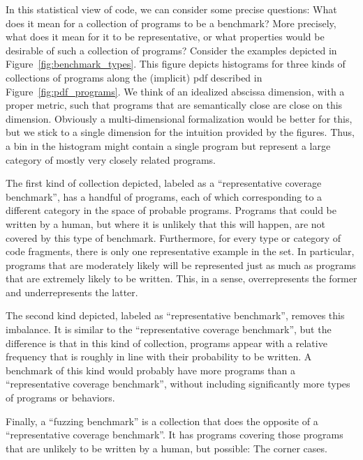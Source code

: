 In this statistical view of code, we can consider some precise questions: What does it mean for a collection of programs to be a benchmark?
More precisely, what does it mean for it to be representative, or what properties would be desirable of such a collection of programs?
Consider the examples depicted in Figure~\ref{fig:benchmark_types}.
This figure depicts histograms for three kinds of collections of programs along the (implicit) pdf described in Figure~\ref{fig:pdf_programs}.
We think of an idealized abscissa dimension, with a proper metric, such that programs that are semantically close are close on this dimension.
Obviously a multi-dimensional formalization would be better for this, but we stick to a single dimension for the intuition provided by the figures.
Thus, a bin in the histogram might contain a single program but represent a large category of mostly very closely related programs.

The first kind of collection depicted, labeled as a ``representative coverage benchmark'', has a handful of programs, each of which corresponding to a different category in the space of probable programs.
Programs that could be written by a human, but where it is unlikely that this will happen, are not covered by this type of benchmark. Furthermore, for every type or category of code fragments, there is only one representative example in the set.
In particular, programs that are moderately likely will be represented just as much as programs that are extremely likely to be written. This, in a sense, overrepresents the former and underrepresents the latter.

The second kind depicted, labeled as ``representative benchmark'', removes this imbalance. It is similar to the ``representative coverage benchmark'', but the difference is that in this kind of collection, programs appear with a relative frequency that is roughly in line with their probability to be written.
A benchmark of this kind would probably have more programs than a ``representative coverage benchmark'', without including significantly more types of programs or behaviors.

Finally, a ``fuzzing benchmark'' is a collection that does the opposite of a ``representative coverage benchmark''. It has programs covering those programs that are unlikely to be written by a human, but possible: The corner cases.

